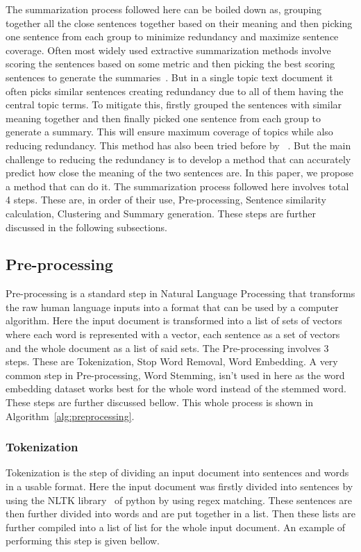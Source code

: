 The summarization process followed here can be boiled down as, grouping together all the close sentences
together based on their meaning and then picking one sentence from each group to minimize redundancy
and maximize sentence coverage.
Often most widely used extractive summarization methods involve scoring the sentences based on some metric and
then picking the best scoring sentences to generate the summaries~\cite{das-2022-tfidf,sarkar-2012-tfidf}.
But in a single topic text document it often picks similar sentences creating redundancy due to all of them having the
central topic terms.
To mitigate this, firstly grouped the sentences with similar meaning together and then finally picked one
sentence from each group to generate a summary.
This will ensure maximum coverage of topics while also reducing redundancy.
This method has also been tried before by \citeauthor{roychowdhury-etal-2022-spectral-base}~\cite{roychowdhury-etal-2022-spectral-base}.
But the main challenge to reducing the redundancy is to develop a method that can accurately predict how close the
meaning of the two sentences are.
In this paper, we propose a method that can do it.
The summarization process followed here involves total 4 steps.
These are, in order of their use, Pre-processing, Sentence similarity calculation, Clustering and Summary generation.
These steps are further discussed in the following subsections.

\subsection{Pre-processing}\label{subsec:pre-processing}
Pre-processing is a standard step in Natural Language Processing that transforms the raw human language
inputs into a format that can be used by a computer algorithm.
Here the input document is transformed into a list of sets of vectors where each word is represented
with a vector, each sentence as a set of vectors and the whole document as a list of said sets.
The Pre-processing involves 3 steps.
These are Tokenization, Stop Word Removal, Word Embedding.
A very common step in Pre-processing, Word Stemming, isn't used in here as the word embedding dataset
works best for the whole word instead of the stemmed word.
These steps are further discussed bellow.
This whole process is shown in Algorithm~\ref{alg:preprocessing}.

\subsubsection{Tokenization}
Tokenization is the step of dividing an input document into sentences and words in a usable format.
Here the input document was firstly divided into sentences by using the NLTK library~\cite{Bird-2009-nltk} of
python by using regex matching.
These sentences are then further divided into words and are put together in a list.
Then these lists are further compiled into a list of list for the whole input document.
An example of performing this step is given bellow.\\

